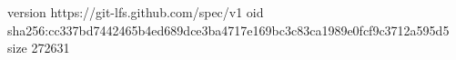 version https://git-lfs.github.com/spec/v1
oid sha256:cc337bd7442465b4ed689dce3ba4717e169bc3c83ca1989e0fcf9c3712a595d5
size 272631

